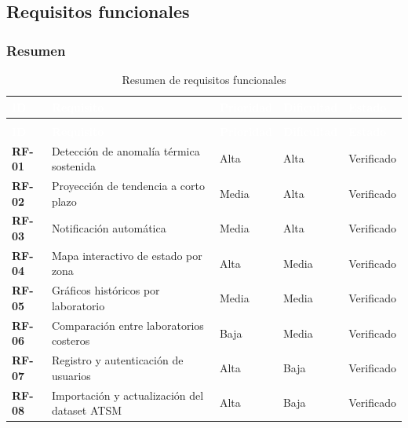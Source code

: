 \documentclass[11pt,a4paper,oneside]{article}
\begin{document}
\subsection{Requisitos funcionales}

\subsubsection{Resumen}

{\small
\begin{xltabular}{\textwidth}{@{}>{\sffamily\bfseries}p{1.5cm}Y>{\raggedright\arraybackslash}p{1.9cm}>{\raggedright\arraybackslash}p{1.9cm}>{\raggedright\arraybackslash}p{2.1cm}@{}}
\caption{Resumen de requisitos funcionales}\label{tab:rfres}\\
\textcolor{white}{\sffamily\bfseries\footnotesize ID} & \textcolor{white}{\sffamily\bfseries\footnotesize Requisito} & \textcolor{white}{\sffamily\bfseries\footnotesize Prioridad} & \textcolor{white}{\sffamily\bfseries\footnotesize Dificultad} & \textcolor{white}{\sffamily\bfseries\footnotesize Estado}\\
\endfirsthead
{}\\
\textcolor{white}{\sffamily\bfseries\footnotesize ID} & \textcolor{white}{\sffamily\bfseries\footnotesize Requisito} & \textcolor{white}{\sffamily\bfseries\footnotesize Prioridad} & \textcolor{white}{\sffamily\bfseries\footnotesize Dificultad} & \textcolor{white}{\sffamily\bfseries\footnotesize Estado}\\
\endhead
RF-01 & Detección de anomalía térmica sostenida & Alta & Alta & Verificado\\ \hline
{}RF-02 & Proyección de tendencia a corto plazo & Media & Alta & Verificado\\ \hline
RF-03 & Notificación automática & Media & Alta & Verificado\\ \hline
{}RF-04 & Mapa interactivo de estado por zona & Alta & Media & Verificado\\ \hline
RF-05 & Gráficos históricos por laboratorio & Media & Media & Verificado\\ \hline
{}RF-06 & Comparación entre laboratorios costeros & Baja & Media & Verificado\\ \hline
RF-07 & Registro y autenticación de usuarios & Alta & Baja & Verificado\\ \hline
{}RF-08 & Importación y actualización del dataset ATSM & Alta & Baja & Verificado\\ \hline
\end{xltabular}}
\vspace{0.6em}
\end{document}
